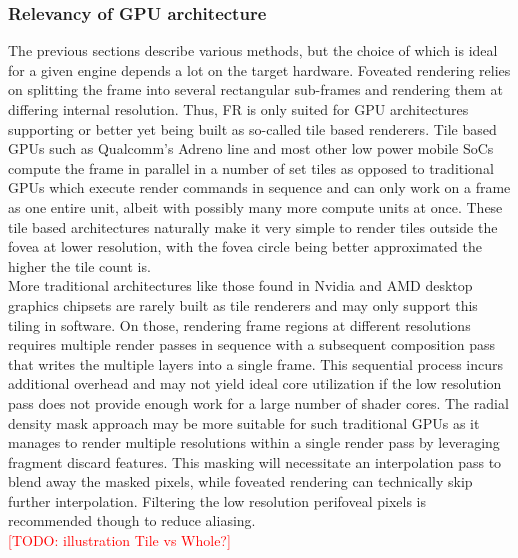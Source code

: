 \subsubsection{Relevancy of GPU architecture}
The previous sections describe various methods, but the choice of which is ideal for a given engine depends a lot on the target hardware. Foveated rendering relies on splitting the frame into several rectangular sub-frames and rendering them at differing internal resolution. Thus, FR is only suited for GPU architectures supporting or better yet being built as so-called tile based renderers. Tile based GPUs such as Qualcomm's Adreno line and most other low power mobile SoCs compute the frame in parallel in a number of set tiles as opposed to traditional GPUs which execute render commands in sequence and can only work on a frame as one entire unit, albeit with possibly many more compute units at once. These tile based architectures naturally make it very simple to render tiles outside the fovea at lower resolution, with the fovea circle being better approximated the higher the tile count is. \\
More traditional architectures like those found in Nvidia and AMD desktop graphics chipsets are rarely built as tile renderers and may only support this tiling in software. On those, rendering frame regions at different resolutions requires multiple render passes in sequence with a subsequent composition pass that writes the multiple layers into a single frame. This sequential process incurs additional overhead and may not yield ideal core utilization if the low resolution pass does not provide enough work for a large number of shader cores. The radial density mask approach may be more suitable for such traditional GPUs as it manages to render multiple resolutions within a single render pass by leveraging fragment discard features. This masking will necessitate an interpolation pass to blend away the masked pixels, while foveated rendering can technically skip further interpolation. Filtering the low resolution perifoveal pixels is recommended though to reduce aliasing. \\

\textcolor{red}{[TODO: illustration Tile vs Whole?]}